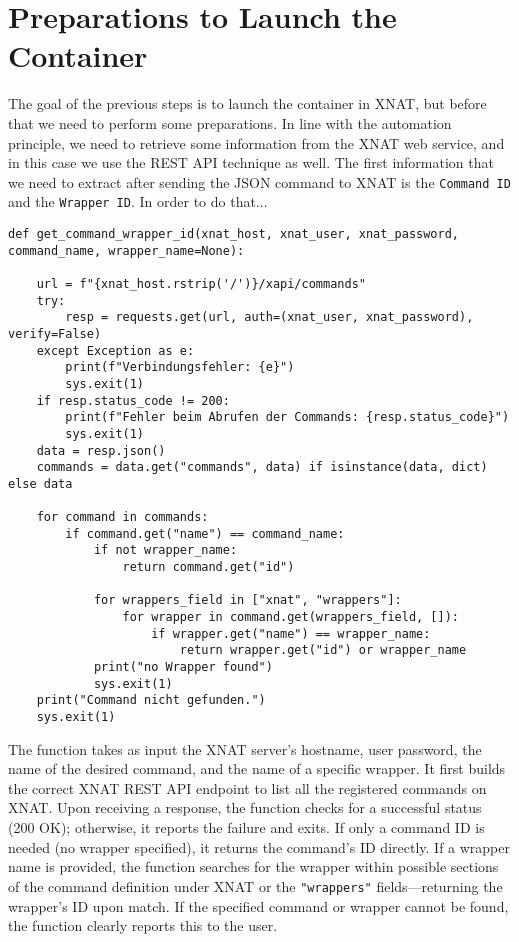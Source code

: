 \section{Preparations to Launch the Container}

The goal of the previous steps is to launch the container in XNAT, but before that we need to perform some preparations. In line with the automation principle, we need to retrieve some information from the XNAT web service, and in this case we use the REST API technique as well. The first information that we need to extract after sending the JSON command to XNAT is the \texttt{Command ID} and the \texttt{Wrapper ID}.
In order to do that...
 
\begin{lstlisting}
def get_command_wrapper_id(xnat_host, xnat_user, xnat_password, command_name, wrapper_name=None):
 
    url = f"{xnat_host.rstrip('/')}/xapi/commands"
    try:
        resp = requests.get(url, auth=(xnat_user, xnat_password), verify=False)
    except Exception as e:
        print(f"Verbindungsfehler: {e}")
        sys.exit(1)
    if resp.status_code != 200:
        print(f"Fehler beim Abrufen der Commands: {resp.status_code}")
        sys.exit(1)
    data = resp.json()
    commands = data.get("commands", data) if isinstance(data, dict) else data

    for command in commands:
        if command.get("name") == command_name:
            if not wrapper_name:
                return command.get("id")
            
            for wrappers_field in ["xnat", "wrappers"]:
                for wrapper in command.get(wrappers_field, []):
                    if wrapper.get("name") == wrapper_name:
                        return wrapper.get("id") or wrapper_name
            print("no Wrapper found")
            sys.exit(1)
    print("Command nicht gefunden.")
    sys.exit(1)
\end{lstlisting}

The function takes as input the XNAT server’s hostname, user password, the name of the desired command, and the name of a specific wrapper. It first builds the correct XNAT REST API endpoint to list all the registered commands on XNAT.
Upon receiving a response, the function checks for a successful status (200 OK); otherwise, it reports the failure and exits. If only a command ID is needed (no wrapper specified), it returns the command’s ID directly. If a wrapper name is provided, the function searches for the wrapper within possible sections of the command definition under XNAT or the \texttt{"wrappers"} fields—returning the wrapper’s ID upon match. If the specified command or wrapper cannot be found, the function clearly reports this to the user.

